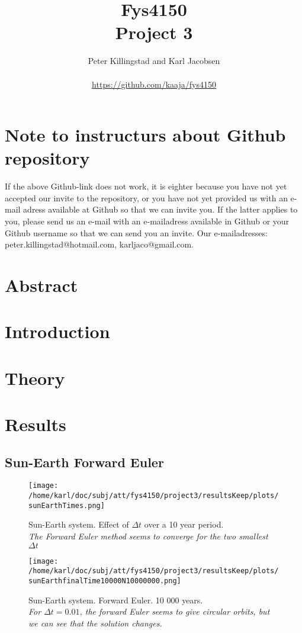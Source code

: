 \documentclass{article}
\title{Fys4150\\Project 3\\ }
\author{Peter Killingstad and Karl Jacobsen\\
\\
\url{https://github.com/kaaja/fys4150}}
\begin{document}
	
\maketitle

\section*{Note to instructurs about Github repository}
If the above Github-link does not work, it is eighter because you have not yet accepted our invite to the repository, or you have not yet provided us with an e-mail adress available at Github so that we can invite you. If the latter applies to you, please send us an e-mail with an e-mailadress available in Github or your Github username so that we can send you an invite. Our e-mailadresses: peter.killingstad@hotmail.com, karljaco@gmail.com.

\section*{Abstract}


\section{Introduction}


\section{Theory}



\section{Results}

\subsection{Sun-Earth Forward Euler}
\begin{figure}[H]
	\centering
	\texttt{[image: /home/karl/doc/subj/att/fys4150/project3/resultsKeep/plots/sunEarthTimes.png]}
	\caption{Sun-Earth system. Effect of $\Delta t$ over a 10 year period. \\ \textit{The Forward Euler method seems to converge for the two smallest $\Delta t$}}
	\label{1}
\end{figure}

\begin{figure}[H]
	\centering
	\texttt{[image: /home/karl/doc/subj/att/fys4150/project3/resultsKeep/plots/sunEarthfinalTime10000N10000000.png]}
	\caption{Sun-Earth system. Forward Euler. 10 000 years. \\ \textit{For $\Delta t = 0.01$, the forward Euler seems to give circular orbits, but we can see that the solution changes.}}
	\label{1}
\end{figure}
\end{document}
